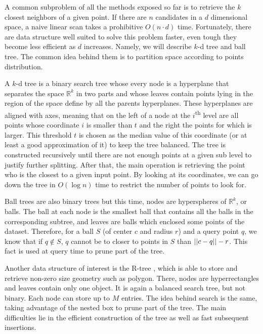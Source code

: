 A common subproblem of all the methods exposed so far is to retrieve the $k$
closest neighbors of a given point. If there are $n$ candidates in a $d$
dimensional space, a naive linear scan takes a prohibitive $O(n\cdot d)$ time.
Fortunately, there are data structure well suited to solve this problem faster,
even tough they become less efficient as $d$ increases. Namely, we will describe
$k$-d tree and ball tree. The common idea behind them is to partition space
according to points distribution.

A $k$-d tree \autocite{kdtree75} is a binary search tree whose every node is a
hyperplane that separates the space $\mathbb{R}^k$ in two parts and whose
leaves contain points lying in the region of the space define by all the
parents hyperplanes. These hyperplanes are aligned with axes, meaning that on
the left of a node at the $i$\textsuperscript{th} level are all points whose
coordinate $i$ is smaller than $t$ and the right the points for which is
larger. This threshold $t$ is chosen as the median value of this coordinate (or
at least a good approximation of it) to keep the tree balanced. The tree is
constructed recursively until there are not enough points at a given sub level
to justify further splitting. After that, the main operation is retrieving the
point who is the closest to a given input point. By looking at its coordinates,
we can go down the tree in $O(\log n)$ time to restrict the number of points to
look for.

Ball trees \autocite{BallTree89} are also binary trees but this time, nodes are
hyperspheres of $\mathbb{R}^k$, or balls. The ball at each node is the smallest
ball that contains all the balls in the corresponding subtree, and leaves are
balls which enclosed some points of the dataset. Therefore, for a ball $S$ (of
center $c$ and radius $r$) and a query point $q$, we know that if $q \notin S$,
$q$ cannot be to closer to points in $S$ than $\left|\left|c - q\right|\right| -r$. This fact is
used at query time to prune part of the tree.

Another data structure of interest is the R-tree \autocite{Rindex84}, which is
able to store and retrieve non-zero size geometry such as polygon. There, nodes
are hyperrectangles and leaves contain only one object. It is again a balanced
search tree, but not binary. Each node can store up to $M$ entries. The idea
behind search is the same, taking advantage of the nested box to prune part of
the tree. The main difficulties lie in the efficient construction of the tree
as well as fast subsequent insertions.


